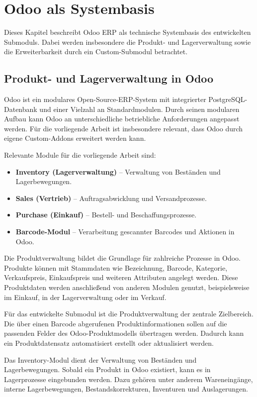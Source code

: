 \documentclass[12pt,a4paper]{article}
\begin{document}
\section{Odoo als Systembasis}

Dieses Kapitel beschreibt Odoo ERP als technische Systembasis des entwickelten Submoduls. Dabei werden insbesondere die Produkt- und Lagerverwaltung sowie die Erweiterbarkeit durch ein Custom-Submodul betrachtet.

\subsection{Produkt- und Lagerverwaltung in Odoo}

Odoo ist ein modulares Open-Source-ERP-System mit integrierter PostgreSQL-Datenbank und einer Vielzahl an Standardmodulen. Durch seinen modularen Aufbau kann Odoo an unterschiedliche betriebliche Anforderungen angepasst werden. Für die vorliegende Arbeit ist insbesondere relevant, dass Odoo durch eigene Custom-Addons erweitert werden kann.

Relevante Module für die vorliegende Arbeit sind:

\begin{itemize}
    \item \textbf{Inventory (Lagerverwaltung)} -- Verwaltung von Beständen und Lagerbewegungen.
    \item \textbf{Sales (Vertrieb)} -- Auftragsabwicklung und Versandprozesse.
    \item \textbf{Purchase (Einkauf)} -- Bestell- und Beschaffungsprozesse.
    \item \textbf{Barcode-Modul} -- Verarbeitung gescannter Barcodes und Aktionen in Odoo.
\end{itemize}

Die Produktverwaltung bildet die Grundlage für zahlreiche Prozesse in Odoo. Produkte können mit Stammdaten wie Bezeichnung, Barcode, Kategorie, Verkaufspreis, Einkaufspreis und weiteren Attributen angelegt werden. Diese Produktdaten werden anschließend von anderen Modulen genutzt, beispielsweise im Einkauf, in der Lagerverwaltung oder im Verkauf.

Für das entwickelte Submodul ist die Produktverwaltung der zentrale Zielbereich. Die über einen Barcode abgerufenen Produktinformationen sollen auf die passenden Felder des Odoo-Produktmodells übertragen werden. Dadurch kann ein Produktdatensatz automatisiert erstellt oder aktualisiert werden.

Das Inventory-Modul dient der Verwaltung von Beständen und Lagerbewegungen. Sobald ein Produkt in Odoo existiert, kann es in Lagerprozesse eingebunden werden. Dazu gehören unter anderem Wareneingänge, interne Lagerbewegungen, Bestandskorrekturen, Inventuren und Auslagerungen.
\end{document}
